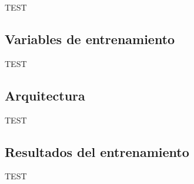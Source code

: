 TEST


\subsection{Variables de entrenamiento}\label{variables}

TEST

\subsection{Arquitectura}\label{arch}

TEST

\subsection{Resultados del entrenamiento}\label{trainresults}

TEST
